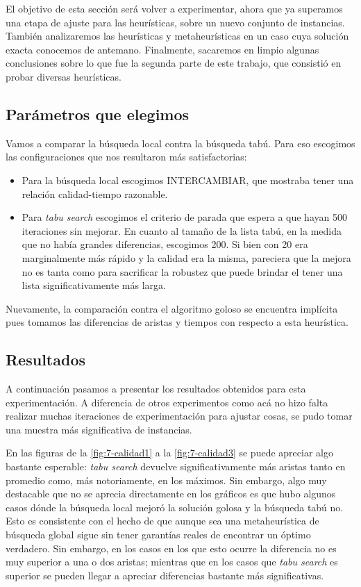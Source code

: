 El objetivo de esta sección será volver a experimentar, ahora que ya superamos una etapa de ajuste para las heurísticas, sobre un nuevo conjunto de instancias. También analizaremos las heurísticas y metaheurísticas en un caso cuya solución exacta conocemos de antemano. Finalmente, sacaremos en limpio algunas conclusiones sobre lo que fue la segunda parte de este trabajo, que consistió en probar diversas heurísticas. 

\subsection{Parámetros que elegimos}
Vamos a comparar la búsqueda local contra la búsqueda tabú. Para eso escogimos las configuraciones que nos resultaron más satisfactorias:
\begin{itemize}
	\item Para la búsqueda local escogimos INTERCAMBIAR, que mostraba tener una relación calidad-tiempo razonable.
	\item Para \emph{tabu search} escogimos el criterio de parada que espera a que hayan 500 iteraciones sin mejorar. En cuanto al tamaño de la lista tabú, en la medida que no había grandes diferencias, escogimos 200. Si bien con 20 era marginalmente más rápido y la calidad era la misma, pareciera que la mejora no es tanta como para sacrificar la robustez que puede brindar el tener una lista significativamente más larga.
\end{itemize}

Nuevamente, la comparación contra el algoritmo goloso se encuentra implícita pues tomamos las diferencias de aristas y tiempos con respecto a esta heurística.

\subsection{Resultados}
A continuación pasamos a presentar los resultados obtenidos para esta experimentación. A diferencia de otros experimentos como acá no hizo falta realizar muchas iteraciones de experimentación para ajustar cosas, se pudo tomar una muestra más significativa de instancias.

En las figuras de la \ref{fig:7-calidad1} a la \ref{fig:7-calidad3} se puede apreciar algo bastante esperable: \emph{tabu search} devuelve significativamente más aristas tanto en promedio como, más notoriamente, en los máximos. Sin embargo, algo muy destacable que no se aprecia directamente en los gráficos es que hubo algunos casos dónde la búsqueda local mejoró la solución golosa y la búsqueda tabú no. Esto es consistente con el hecho de que aunque sea una metaheurística de búsqueda global sigue sin tener garantías reales de encontrar un óptimo verdadero. Sin embargo, en los casos en los que esto ocurre la diferencia no es muy superior a una o dos aristas; mientras que en los casos que \emph{tabu search} es superior se pueden llegar a apreciar diferencias bastante más significativas.

